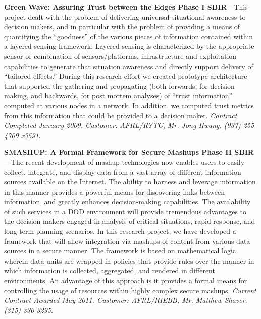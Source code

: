 \documentclass{sbir}
\begin{document}
{\bf Green Wave: Assuring Trust between the Edges Phase I SBIR}---This project dealt with the problem of delivering universal situational awareness to decision makers, and in particular with the problem of providing a means of quantifying the ``goodness'' of the various pieces of information contained within a layered sensing framework. Layered sensing is characterized by the appropriate sensor or combination of sensors/platforms, infrastructure and exploitation capabilities to generate that situation awareness and directly support delivery of ``tailored effects.'' During this research effort we created prototype architecture that supported the gathering and propagating (both forwards, for decision making, and backwards, for post mortem analyses) of ``trust information'' computed at various nodes in a network. In addition, we computed trust metrics from this information that could be provided to a decision maker. \emph{Contract Completed January 2009. Customer: AFRL/RYTC, Mr. Jong Hwang. (937) 255-4709 x3591}.

{\bf SMASHUP: A Formal Framework for Secure Mashups Phase II SBIR}---The recent development of mashup technologies now enables users to easily collect, integrate, and display data from a vast array of different information sources available on the Internet. The ability to harness and leverage information in this manner provides a powerful means for discovering links between information, and greatly enhances decision-making capabilities. The availability of such services in a DOD environment will provide tremendous advantages to the decision-makers engaged in analysis of critical situations, rapid-response, and long-term planning scenarios. In this research project, we have developed a framework that will allow integration via mashups of content from various data sources in a secure manner. The framework is based on mathematical logic wherein data units are wrapped in policies that provide rules over the manner in which information is collected, aggregated, and rendered in different environments. An advantage of this approach is it provides a formal means for controlling the usage of resources within highly complex secure mashups. \emph{Current Contract Awarded May 2011. Customer: AFRL/RIEBB, Mr. Matthew Shaver. (315) 330-3295}.
\end{document}
